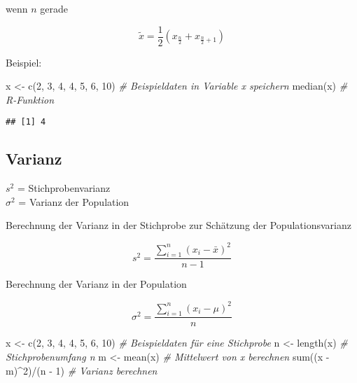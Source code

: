 \documentclass[
]{book}
\newenvironment{Shaded}{\begin{snugshade}}{\end{snugshade}}
\newcommand{\CommentTok}[1]{\textcolor[rgb]{0.56,0.35,0.01}{\textit{#1}}}
\newcommand{\DecValTok}[1]{\textcolor[rgb]{0.00,0.00,0.81}{#1}}
\newcommand{\FunctionTok}[1]{\textcolor[rgb]{0.00,0.00,0.00}{#1}}
\newcommand{\NormalTok}[1]{#1}
\newcommand{\OtherTok}[1]{\textcolor[rgb]{0.56,0.35,0.01}{#1}}
\newcommand{\SpecialCharTok}[1]{\textcolor[rgb]{0.00,0.00,0.00}{#1}}
\begin{document}
wenn \(n\) gerade

\begin{equation}
  \tilde{x} = \frac{1}{2}(x_{\frac{n}{2}} + {x_{\frac{n}{2}+1}})
  \label{eq:median2}
\end{equation}

Beispiel:

\begin{Shaded}
\begin{Highlighting}[]
\NormalTok{x }\OtherTok{\textless{}{-}} \FunctionTok{c}\NormalTok{(}\DecValTok{2}\NormalTok{, }\DecValTok{3}\NormalTok{, }\DecValTok{4}\NormalTok{, }\DecValTok{4}\NormalTok{, }\DecValTok{5}\NormalTok{, }\DecValTok{6}\NormalTok{, }\DecValTok{10}\NormalTok{)  }\CommentTok{\# Beispieldaten in Variable x speichern}
\FunctionTok{median}\NormalTok{(x)                     }\CommentTok{\# R{-}Funktion}
\end{Highlighting}
\end{Shaded}

\begin{verbatim}
## [1] 4
\end{verbatim}

\hypertarget{varianz}{%
\subsection{Varianz}\label{varianz}}

\(s^2\) = Stichprobenvarianz\\
\(\sigma^2\) = Varianz der Population

Berechnung der Varianz in der Stichprobe zur Schätzung der Populationsvarianz

\begin{equation}
  s^2 = \frac{\sum_{i=1}^n (x_i - \bar{x})^2}{n-1}
  \label{eq:varsample}
\end{equation}

Berechnung der Varianz in der Population

\begin{equation}
  \sigma^2 = \frac{\sum_{i=1}^n (x_i - \mu)^2}{n}
  \label{eq:varpop}
\end{equation}

\begin{Shaded}
\begin{Highlighting}[]
\NormalTok{x }\OtherTok{\textless{}{-}} \FunctionTok{c}\NormalTok{(}\DecValTok{2}\NormalTok{, }\DecValTok{3}\NormalTok{, }\DecValTok{4}\NormalTok{, }\DecValTok{4}\NormalTok{, }\DecValTok{5}\NormalTok{, }\DecValTok{6}\NormalTok{, }\DecValTok{10}\NormalTok{)      }\CommentTok{\# Beispieldaten für eine Stichprobe}
\NormalTok{n }\OtherTok{\textless{}{-}} \FunctionTok{length}\NormalTok{(x)                    }\CommentTok{\# Stichprobenumfang n }
\NormalTok{m }\OtherTok{\textless{}{-}} \FunctionTok{mean}\NormalTok{(x)                      }\CommentTok{\# Mittelwert von x berechnen}
\FunctionTok{sum}\NormalTok{((x }\SpecialCharTok{{-}}\NormalTok{ m)}\SpecialCharTok{\^{}}\DecValTok{2}\NormalTok{)}\SpecialCharTok{/}\NormalTok{(n }\SpecialCharTok{{-}} \DecValTok{1}\NormalTok{)            }\CommentTok{\# Varianz berechnen}
\end{Highlighting}
\end{Shaded}
\end{document}
